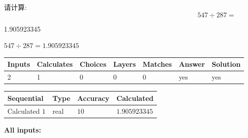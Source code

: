 \documentclass{ctexart}
\begin{document}
请计算:
\begin{equation}
547  \div    %
287 = \nonumber
\end{equation}
 
 
 
\noindent{}
 
 

1.905923345
 
 
\noindent{}
 
 

 
 
 
\noindent{}
 
 

$ %
547 \div  %
287=   %
1.905923345$
 
 
\noindent{}
 
 

 
   
   
   
   
\noindent\begin{tabular}{|l|l|l|l|l|l|l|}
 \hline
Inputs & Calculates & Choices & Layers & Matches & Answer & Solution \\ \hline
 2  & 
 1  & 
 0
  & 
 0  & 
 0  & 
  yes & 
  yes 
  \\ \hline
 \end{tabular}
   
   
   
   
\noindent{}
   
   
  
  
\noindent\begin{tabular}{|l|l|l|l|}
\hline
 Sequential & Type & Accuracy & Calculated \\ 
\hline
 
 
  Calculated $  1 $ & real & $  10  $ & 
 $ 1.905923345 $ 
 \\  \hline  
 \end{tabular}
   
   
   
   
\noindent\vspace{0.1in}\hspace{-0.08in} {\textbf{\Large{All inputs: }}}
   
\end{document}
